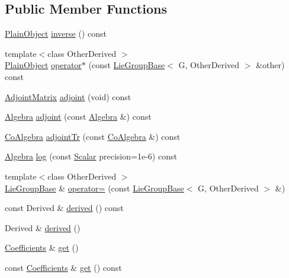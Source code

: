 \subsection*{Public Member Functions}
\begin{DoxyCompactItemize}
\item 
\hyperlink{class_lie_group_base_a37b1d64048a2fa65b298801f6028c468}{Plain\+Object} \hyperlink{class_lie_group_base_a7654738542ae367b4cc61a0e87ad3f03}{inverse} () const
\item 
{\footnotesize template$<$class Other\+Derived $>$ }\\\hyperlink{class_lie_group_base_a37b1d64048a2fa65b298801f6028c468}{Plain\+Object} \hyperlink{class_lie_group_base_aa92fc890406f74fe793031d9175fb033}{operator$\ast$} (const \hyperlink{class_lie_group_base}{Lie\+Group\+Base}$<$ G, Other\+Derived $>$ \&other) const
\item 
\hyperlink{class_lie_group_base_ab310fae7cfc1fe04e9d286403f2d4211}{Adjoint\+Matrix} \hyperlink{class_lie_group_base_ad9cc69d31a563a4270be482d41382e4a}{adjoint} (void) const
\item 
\hyperlink{class_lie_group_base_a3730354b1a76881717834e3dfd3187bd}{Algebra} \hyperlink{class_lie_group_base_a348b65aebd4a92d88cafc9e23482bd26}{adjoint} (const \hyperlink{class_lie_group_base_a3730354b1a76881717834e3dfd3187bd}{Algebra} \&) const
\item 
\hyperlink{class_lie_group_base_a7d87259a140110af06f8bca9933b878d}{Co\+Algebra} \hyperlink{class_lie_group_base_aa83ed8fa7640b9c76969b179ee608317}{adjoint\+Tr} (const \hyperlink{class_lie_group_base_a7d87259a140110af06f8bca9933b878d}{Co\+Algebra} \&) const
\item 
\hyperlink{class_lie_group_base_a3730354b1a76881717834e3dfd3187bd}{Algebra} \hyperlink{class_lie_group_base_a0c9704d0b38f9f02390a9605c6c8c686}{log} (const \hyperlink{class_lie_group_base_aca48436862e5a14a15b91566440ef964}{Scalar} precision=1e-\/6) const
\item 
{\footnotesize template$<$class Other\+Derived $>$ }\\\hyperlink{class_lie_group_base}{Lie\+Group\+Base} \& \hyperlink{class_lie_group_base_a04e47ec54e5898190682b03794a6b9af}{operator=} (const \hyperlink{class_lie_group_base}{Lie\+Group\+Base}$<$ G, Other\+Derived $>$ \&)
\item 
const Derived \& \hyperlink{class_lie_group_base_a26dd47c7d6ea848a03490f7f4ddc119e}{derived} () const
\item 
Derived \& \hyperlink{class_lie_group_base_ac89ffa5560eb6a42586c69c6b35defe6}{derived} ()
\item 
\hyperlink{class_lie_group_base_abb840873afd0a4f54f9ad4265e1d0095}{Coefficients} \& \hyperlink{class_lie_group_base_a94dd7196c1e06c23ebcd5284982b2bc9}{get} ()
\item 
const \hyperlink{class_lie_group_base_abb840873afd0a4f54f9ad4265e1d0095}{Coefficients} \& \hyperlink{class_lie_group_base_a16ad337b62494de47bb79690a1831523}{get} () const
\end{DoxyCompactItemize}
